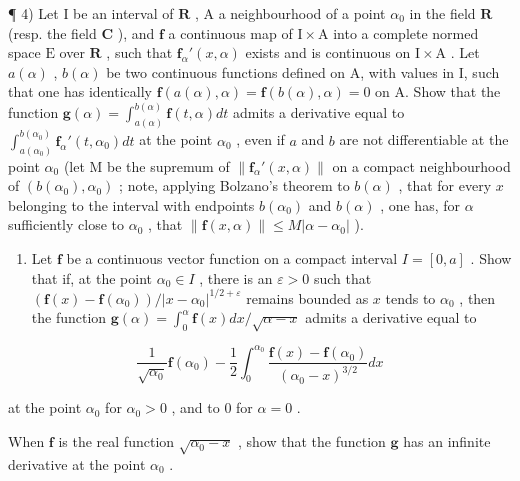 ¶ 4) Let I be an interval of \(\mathbf{R}\) , A a neighbourhood of a point \(\alpha_0\) in the field \(\mathbf{R}\) (resp. the field \(\mathbf{C}\) ), and \(\mathbf{f}\) a continuous map of \(\mathrm{I} \times \mathrm{A}\) into a complete normed space \(\mathrm{E}\) over \(\mathbf{R}\) , such that \(\mathbf{f}_{\alpha}'(x, \alpha)\) exists and is continuous on \(\mathrm{I} \times \mathrm{A}\) . Let \(a(\alpha)\) , \(b(\alpha)\) be two continuous functions defined on A, with values in I, such that one has identically \(\mathbf{f}(a(\alpha), \alpha) = \mathbf{f}(b(\alpha), \alpha) = 0\) on A. Show that the function \(\mathbf{g}(\alpha) = \int_{a(\alpha)}^{b(\alpha)} \mathbf{f}(t, \alpha) dt\) admits a derivative equal to \(\int_{a(\alpha_0)}^{b(\alpha_0)} \mathbf{f}_{\alpha}'(t, \alpha_0) dt\) at the point \(\alpha_0\) , even if \(a\) and \(b\) are not differentiable at the point \(\alpha_0\) (let M be the supremum of \(\left\| \mathbf{f}_{\alpha}'(x, \alpha) \right\|\) on a compact neighbourhood of \((b(\alpha_0), \alpha_0)\) ; note, applying Bolzano's theorem to \(b(\alpha)\) , that for every \(x\) belonging to the interval with endpoints \(b(\alpha_0)\) and \(b(\alpha)\) , one has, for \(\alpha\) sufficiently close to \(\alpha_0\) , that \(\| \mathbf{f}(x, \alpha) \| \leqslant M |\alpha - \alpha_0|\) ).

\begin{enumerate}
\def\labelenumi{\arabic{enumi})}
\setcounter{enumi}{4}
\tightlist
\item
  Let \(\mathbf{f}\) be a continuous vector function on a compact interval \(I = [0, a]\) . Show that if, at the point \(\alpha_0 \in I\) , there is an \(\varepsilon > 0\) such that \((\mathbf{f}(x) - \mathbf{f}(\alpha_0)) / |x - \alpha_0|^{1/2 + \varepsilon}\) remains bounded as \(x\) tends to \(\alpha_0\) , then the function \(\mathbf{g}(\alpha) = \int_0^\alpha \mathbf{f}(x) dx / \sqrt{\alpha - x}\) admits a derivative equal to
\end{enumerate}

\[
\frac {1}{\sqrt {\alpha_ {0}}} \mathbf {f} (\alpha_ {0}) - \frac {1}{2} \int_ {0} ^ {\alpha_ {0}} \frac {\mathbf {f} (x) - \mathbf {f} (\alpha_ {0})}{(\alpha_ {0} - x) ^ {3 / 2}} d x
\]

at the point \(\alpha_0\) for \(\alpha_0 > 0\) , and to 0 for \(\alpha = 0\) .

When \(\mathbf{f}\) is the real function \(\sqrt{\alpha_0 - x}\) , show that the function \(\mathbf{g}\) has an infinite derivative at the point \(\alpha_0\) .

